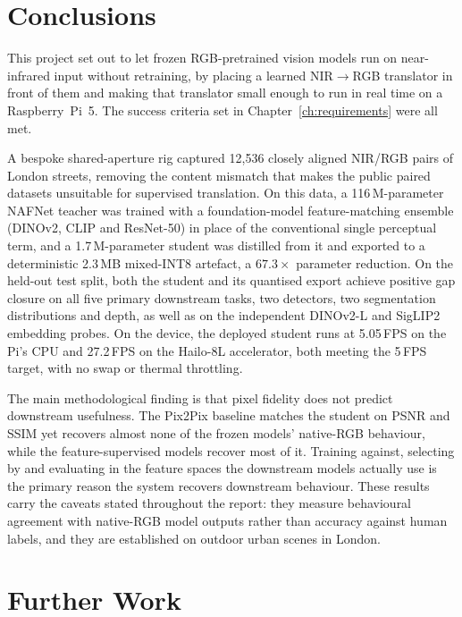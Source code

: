 \label{ch:conclusions}

\section{Conclusions}
\label{sec:conclusions_summary}

This project set out to let frozen RGB-pretrained vision models run on near-infrared input without retraining, by placing a learned NIR$\rightarrow$RGB translator in front of them and making that translator small enough to run in real time on a Raspberry~Pi~5. The success criteria set in Chapter~\ref{ch:requirements} were all met.

A bespoke shared-aperture rig captured 12{,}536 closely aligned NIR/RGB pairs of London streets, removing the content mismatch that makes the public paired datasets unsuitable for supervised translation. On this data, a 116\,M-parameter NAFNet teacher was trained with a foundation-model feature-matching ensemble (DINOv2, CLIP and ResNet-50) in place of the conventional single perceptual term, and a 1.7\,M-parameter student was distilled from it and exported to a deterministic 2.3\,MB mixed-INT8 artefact, a $67.3\times$ parameter reduction. On the held-out test split, both the student and its quantised export achieve positive gap closure on all five primary downstream tasks, two detectors, two segmentation distributions and depth, as well as on the independent DINOv2-L and SigLIP2 embedding probes. On the device, the deployed student runs at 5.05\,FPS on the Pi's CPU and 27.2\,FPS on the Hailo-8L accelerator, both meeting the 5\,FPS target, with no swap or thermal throttling.

The main methodological finding is that pixel fidelity does not predict downstream usefulness. The Pix2Pix baseline matches the student on PSNR and SSIM yet recovers almost none of the frozen models' native-RGB behaviour, while the feature-supervised models recover most of it. Training against, selecting by and evaluating in the feature spaces the downstream models actually use is the primary reason the system recovers downstream behaviour. These results carry the caveats stated throughout the report: they measure behavioural agreement with native-RGB model outputs rather than accuracy against human labels, and they are established on outdoor urban scenes in London.

\section{Further Work}
\label{sec:conclusions_further_work}

